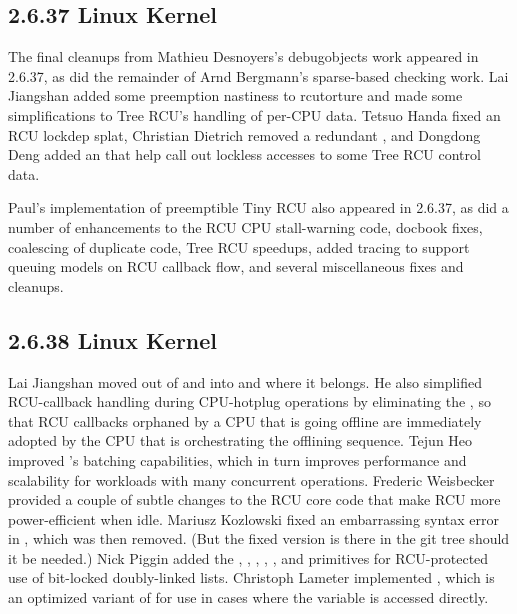\subsection{2.6.37 Linux Kernel}

The final cleanups from Mathieu Desnoyers's debugobjects work appeared
in 2.6.37, as did the remainder of Arnd Bergmann's sparse-based checking work.
Lai Jiangshan added some preemption nastiness to rcutorture and
made some simplifications to Tree RCU's handling of per-CPU data.
Tetsuo Handa fixed an RCU lockdep splat, Christian Dietrich removed
a redundant , and Dongdong Deng added an
 that help call out lockless accesses to some
Tree RCU control data.

Paul's implementation of preemptible Tiny RCU also appeared in
2.6.37, as did a number of enhancements to the RCU CPU stall-warning
code, docbook fixes, coalescing of duplicate code, Tree RCU speedups,
added tracing to support queuing models on RCU callback flow,
and several miscellaneous fixes and cleanups.

\subsection{2.6.38 Linux Kernel}

Lai Jiangshan moved  out of
 and into  and
 where it belongs.
He also simplified RCU-callback handling during CPU-hotplug operations
by eliminating the , so that RCU callbacks
orphaned by a CPU that is going offline are immediately adopted by
the CPU that is orchestrating the offlining sequence.
Tejun Heo improved 's batching
capabilities, which in turn improves performance and scalability
for workloads with many concurrent 
operations.
Frederic Weisbecker provided a couple of subtle changes to the
RCU core code that make RCU more power-efficient when idle.
Mariusz Kozlowski fixed an embarrassing syntax error in
, which was then removed.
(But the fixed version is there in the git tree should it be needed.)
Nick Piggin added the ,
,
,
,
, and
 primitives for RCU-protected use
of bit-locked doubly-linked lists.
Christoph Lameter implemented , which is an
optimized variant of
 for use in cases where the variable is accessed directly.

